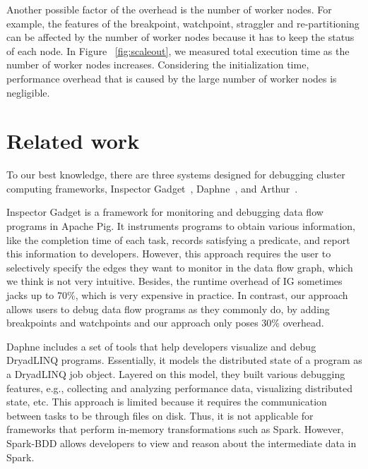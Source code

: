 \documentclass{acm_proc_article-sp}
\begin{document}
Another possible factor of the overhead is the number of worker nodes. For example, the features of the breakpoint, watchpoint, straggler and re-partitioning can be affected by the number of worker nodes because it has to keep the status of each node. In Figure ~\ref{fig:scaleout}, we measured total execution time as the number of worker nodes increases. Considering the initialization time, performance overhead that is caused by the large number of worker nodes is negligible.

\section{Related work}
To our best knowledge, there are three systems designed for debugging cluster computing frameworks, Inspector Gadget~\cite{olston2011inspector}, Daphne~\cite{jagannath2011monitoring}, and Arthur~\cite{dave2013arthur}. 

Inspector Gadget is a framework for monitoring and debugging data flow programs in Apache Pig. It instruments programs to obtain various information, like the completion time of each task, records satisfying a predicate, and report this information to developers. However, this approach requires the user to selectively specify the edges they want to monitor in the data flow graph, which we think is not very intuitive. Besides, the runtime overhead of IG sometimes jacks up to 70\%, which is very expensive in practice. In contrast, our approach allows users to debug data flow programs as they commonly do, by adding breakpoints and watchpoints and our approach only poses 30\% overhead. 

Daphne includes a set of tools that help developers visualize and debug DryadLINQ programs. Essentially, it models the distributed state of a program as a DryadLINQ job object. Layered on this model, they built various debugging features, e.g., collecting and analyzing performance data, visualizing distributed state, etc. This approach is limited because it requires the communication between tasks to be through files on disk. Thus, it is not applicable for frameworks that perform in-memory transformations such as Spark. However, Spark-BDD allows developers to view and reason about the intermediate data in Spark. 
\end{document}
